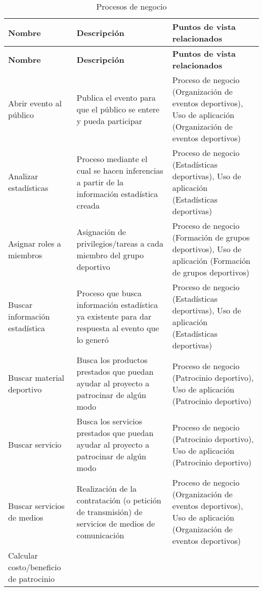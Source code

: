 \newpage

\begin{center}
	\begin{longtable}{|p{4cm}|p{7cm}|p{4cm}|}
		\caption{Procesos de negocio \label{tab:procesos_negocio}} \\
		\hline
		\textbf{Nombre} &
		\textbf{Descripción} &
		\textbf{Puntos de vista relacionados} \\
		\hline
		\endfirsthead
		\hline
		\textbf{Nombre} &
		\textbf{Descripción} &
		\textbf{Puntos de vista relacionados} \\
		\hline
		\endhead
		\hline
		\endfoot
		\hline
		\endlastfoot
		Abrir evento al público & 
		Publica el evento para que el público se entere y pueda participar & 
		Proceso de negocio (Organización de eventos deportivos), Uso de aplicación (Organización de eventos deportivos)
		\\
		\hline
		Analizar estadísticas & 
		Proceso mediante el cual se hacen inferencias a partir de la información estadística creada & 
		Proceso de negocio (Estadísticas deportivas), Uso de aplicación (Estadísticas deportivas)
		\\
		\hline
		Asignar roles a miembros & 
		Asignación de privilegios/tareas a cada miembro del grupo deportivo & 
		Proceso de negocio (Formación de grupos deportivos), Uso de aplicación (Formación de grupos deportivos)
		\\
		\hline
		Buscar información estadística & 
		Proceso que busca información estadística ya existente para dar respuesta al evento que lo generó & 
		Proceso de negocio (Estadísticas deportivas), Uso de aplicación (Estadísticas deportivas)
		\\
		\hline
		Buscar material deportivo & 
		Busca los productos prestados que puedan ayudar al proyecto a patrocinar de algún modo & 
		Proceso de negocio (Patrocinio deportivo), Uso de aplicación (Patrocinio deportivo)
		\\
		\hline
		Buscar servicio & 
		Busca los servicios prestados que puedan ayudar al proyecto a patrocinar de algún modo & 
		Proceso de negocio (Patrocinio deportivo), Uso de aplicación (Patrocinio deportivo)
		\\
		\hline
		Buscar servicios de medios & 
		Realización de la contratación (o petición de transmisión) de servicios de medios de comunicación & 
		Proceso de negocio (Organización de eventos deportivos), Uso de aplicación (Organización de eventos deportivos)
		\\
		\hline
		Calcular costo/beneficio de patrocinio & 

\end{longtable}
\end{center}
